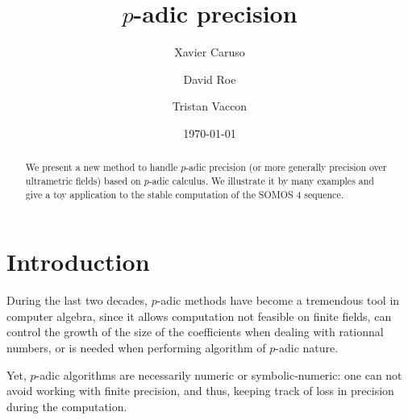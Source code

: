 \documentclass{lms}
\begin{document}
\newtheorem{theo}{Theorem}[section]
\newtheorem{lem}[theo]{Lemma}
\newtheorem{prop}[theo]{Proposition}
\newtheorem{cor}[theo]{Corollary}
\newtheorem{quest}[theo]{Question}
\newtheorem{rem}[theo]{Remark}
\newtheorem{ex}[theo]{Example}
\newtheorem{deftn}[theo]{Definition}
\newtheorem{rmk}[theo]{Remark}

\newcommand{\Z}{\mathbb Z}
\newcommand{\Zp}{\Z_p}
\newcommand{\Q}{\mathbb Q}
\newcommand{\Qp}{\Q_p}
\newcommand{\R}{\mathbb R}
\renewcommand{\O}{\mathcal O}
\newcommand{\XX}{\mathbf X}
\newcommand{\trans}{{}^{\text t}}

\newcommand{\GL}{\text{\rm GL}}

\newcommand{\val}{\text{\rm val}}
\newcommand{\tr}{\text{\rm Tr}}
\newcommand{\com}{\text{\rm Com}}
\newcommand{\Grass}{\text{\rm Grass}}
\renewcommand{\prec}{\text{\rm prec}}

\def\todo#1{\ \!\!{\color{red} #1}}
\def\todofor#1#2{\ \!\!{\color{purple} {\bf #1}: #2}}

\title{$p$-adic precision}
\author{Xavier Caruso}
\author{David Roe}
\author{Tristan Vaccon}
\date\today

\maketitle
\begin{abstract}
We present a new method to handle $p$-adic precision (or more generally
precision over ultrametric fields) based on $p$-adic calculus.
We illustrate it by many examples and give a toy application to the
stable computation of the SOMOS 4 sequence.
\end{abstract}

\setcounter{tocdepth}{1}
\tableofcontents

\section{Introduction}

During the last two decades, $p$-adic methods have become a tremendous tool in computer algebra, since it allows computation not feasible on finite fields, can control the growth of the size of the coefficients when dealing with rationnal numbers, or is needed when performing algorithm of $p$-adic nature.

Yet, $p$-adic algorithms are necessarily numeric or symbolic-numeric: one can not avoid working with finite precision, and thus, keeping track of loss in precision during the computation.
\end{document}
